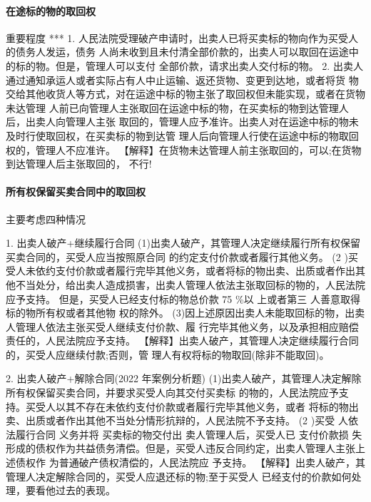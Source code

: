\documentclass[UTF8,12pt]{ctexart}
\numberwithin{equation}{section} %
\numberwithin{figure}{section}
\numberwithin{table}{section}
\begin{document}
	\paragraph{在途标的物的取回权}
	重要程度 ***
	1. 人民法院受理破产申请时，出卖人已将买卖标的物向作为买受人的债务人发运，债务 人尚未收到且未付清全部价款的，出卖人可以取回在运途中的标的物。但是，管理人可以支付 全部价款，请求出卖人交付标的物。
	2. 出卖人通过通知承运人或者实际占有人中止运输、返还货物、变更到达地，或者将货 物交给其他收货人等方式，对在运途中标的物主张了取回权但未能实现，或者在货物未达管理 人前已向管理人主张取回在运途中标的物，在买卖标的物到达管理人后，出卖人向管理人主张 取回的，管理人应予准许。出卖人对在运途中标的物未及时行使取回权，在买卖标的物到达管 理人后向管理人行使在运途中标的物取回权的，管理人不应准许。
	【解释】在货物未达管理人前主张取回的，可以;在货物到达管理人后主张取回的， 不行!
	
	\paragraph{所有权保留买卖合同中的取回权}
	主要考虑四种情况
	
	1. 出卖人破产+继续履行合同 
	(1)出卖人破产，其管理人决定继续履行所有权保留买卖合同的，买受人应当按照原合同 的约定支付价款或者履行其他义务。
	(2 )买受人未依约支付价款或者履行完毕其他义务，或者将标的物出卖、出质或者作出其 他不当处分，给出卖人造成损害，出卖人管理人依法主张取回标的物的，人民法院应予支持。 但是，买受人已经支付标的物总价款 75 \%以 上或者第三 人善意取得标的物所有权或者其他物 权的除外。 
	(3)因上述原因出卖人未能取回标的物，出卖人管理人依法主张买受人继续支付价款、履 行完毕其他义务，以及承担相应赔偿责任的，人民法院应予支持。
	【解释】出卖人破产，其管理人决定继续履行合同的，买受人应继续付款;否则，管 理人有权将标的物取回(除非不能取回)。
	
	2. 出卖人破产+解除合同(2022 年案例分析题) 
	(1)出卖人破产，其管理人决定解除所有权保留买卖合同，并要求买受人向其交付买卖标 的物的，人民法院应予支持。买受人以其不存在未依约支付价款或者履行完毕其他义务，或者 将标的物出卖、出质或者作出其他不当处分情形抗辩的，人民法院不予支持。
	(2 )买受 人依法履行合同 义务并将 买卖标的物交付出 卖人管理人后，买受人已 支付价款损 失形成的债权作为共益债务清偿。但是，买受人违反合同约定，出卖人管理人主张上述债权作 为普通破产债权清偿的，人民法院应 予支持。
	【解释】出卖人破产，其管理人决定解除合同的，买受人应退还标的物;至于买受人 已经支付的价款如何处理，要看他过去的表现。
	
\end{document}
